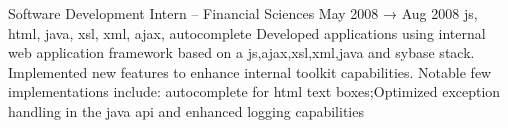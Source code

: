 Software Development Intern – Financial Sciences May 2008 → Aug 2008
js, html, java, xsl, xml, ajax, autocomplete
Developed applications using internal web application framework based on a js,ajax,xsl,xml,java and sybase
stack.
Implemented new features to enhance internal toolkit capabilities. Notable few implementations include:
autocomplete for html text boxes;Optimized exception handling in the java api and enhanced logging capabilities